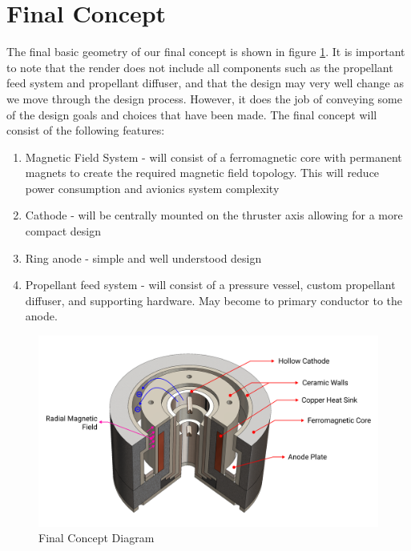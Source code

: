 \section{Final Concept}

The final basic geometry of our final concept is shown in figure \ref{fig:final_concept}. It is important to note that the render does not include all components such as the propellant feed system and propellant diffuser, and that the design may very well change as we move through the design process. However, it does the job of conveying some of the design goals and choices that have been made. The final concept will consist of the following features:

\begin{enumerate}
    \item Magnetic Field System - will consist of a ferromagnetic core with permanent magnets to create the required magnetic field topology. This will reduce power consumption and
    avionics system complexity
    \item Cathode - will be centrally mounted on the thruster axis allowing for a more compact design
    \item Ring anode - simple and well understood design
    \item Propellant feed system - will consist of a pressure vessel, custom propellant diffuser, and supporting hardware. May become to primary conductor to the anode.
\end{enumerate}

\begin{figure}[H]
    \centering
    \includegraphics[width=1.0\textwidth]{images/Concepts/final concept.png}
    \captionsetup{justification=centering}
    \caption{Final Concept Diagram}
    \label{fig:final_concept}
\end{figure}